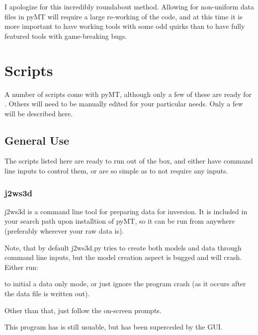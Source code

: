 \documentclass[letterpaper,10pt,english]{sphinxmanual}
\begin{document}
I apologize for this incredibly roundabout method. Allowing for non-uniform data files in pyMT will require a large re-working of the code, and at this time it is more important to have working tools with some odd quirks than to have fully featured tools with game-breaking bugs.


\section{Scripts}
\label{\detokenize{content/examples/scripts:scripts}}\label{\detokenize{content/examples/scripts::doc}}
A number of scripts come with pyMT, although only a few of these are ready for {\hyperref[\detokenize{content/examples/scripts:general-use}]{}} . Others will need to be manually edited for your particular needs. Only a few will be described here.


\subsection{General Use}
\label{\detokenize{content/examples/scripts:general-use}}
The scripts listed here are ready to run out of the box, and either have command line inputs to control them, or are so simple as to not require any inputs.


\subsubsection{j2ws3d}
\label{\detokenize{content/examples/scripts:j2ws3d}}
j2ws3d is a command line tool for preparing data for inversion. It is included in your search path upon installtion of pyMT, so it can be run from anywhere (preferably wherever your raw data is).

Note, that by default j2ws3d.py tries to create both models and data through command line inputs, but the model creation aspect is bugged and will crash. Either run:

\begin{sphinxVerbatim}[commandchars=\\\{\}]
 
\end{sphinxVerbatim}

to initial a data only mode, or just ignore the program crash (as it occurs after the data file is written out).

Other than that, just follow the on-screen prompts.

This program has is still usuable, but has been superceded by the {\hyperref[\detokenize{content/data_plot/main_window:data-plot}]{}} GUI.
\end{document}

